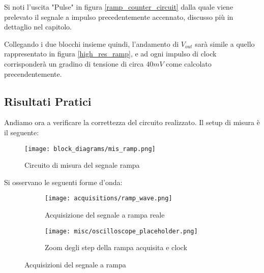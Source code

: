 Si noti l'uscita "Pulse" in figura \ref{ramp_counter_circuit} dalla quale viene prelevato
il segnale a impulso precedentemente accennato, discusso più in dettaglio nel capitolo.

Collegando i due blocchi insieme quindi, l'andamento di $V_{out}$ sarà simile a quello
rappresentato in figura \ref{high_res_ramp}, e ad ogni impulso di clock corrisponderà un
gradino di tensione di circa $40mV$ come calcolato precendentemente.


\subsection*{Risultati Pratici}


Andiamo ora a verificare la correttezza del circuito realizzato. Il setup di misura è il
seguente:
\medskip

\begin{figure}[ht]
    \centering
    \texttt{[image: block\_diagrams/mis\_ramp.png]}
    \caption{Circuito di misura del segnale rampa}
    \label{mis_ramp}
\end{figure}

Si osservano le seguenti forme d'onda:
\medskip

\begin{figure}[ht]
    \centering

    \begin{subfigure}{.5\textwidth}
        \centering
        \texttt{[image: acquisitions/ramp\_wave.png]}
        \caption{Acquisizione del segnale a rampa reale}
        \label{acq_ramp}
    \end{subfigure}%
    \begin{subfigure}{.5\textwidth}
        \centering
        \texttt{[image: misc/oscilloscope\_placeholder.png]}
        \caption{Zoom degli step della rampa acquisita e clock}
        \label{acq_ramp_steps}
    \end{subfigure}

    \caption{Acquisizioni del segnale a rampa}
    \label{acq_ramp_signals}
\end{figure}


